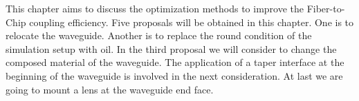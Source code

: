This chapter aims to discuss the optimization methods to improve the Fiber-to-Chip coupling efficiency. Five proposals will be obtained in this chapter. One is to relocate the waveguide. Another is to replace the round condition of the simulation setup with oil. In the third proposal we will consider to change the composed material of the waveguide.  The application of a taper interface at the beginning of the waveguide is involved in the next consideration. At last we are going to mount a lens at the waveguide end face.
